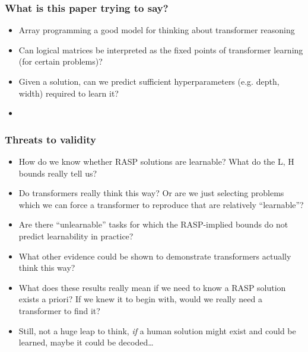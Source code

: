 \documentclass[mathserif,notheorems]{beamer}
\theoremstyle{plain} %
\theoremstyle{definition} %
\begin{document}

  \begin{frame}
    \frametitle{What is this paper trying to say?}
    \begin{itemize}
      \item Array programming a good model for thinking about transformer reasoning
      \item Can logical matrices be interpreted as the fixed points of transformer learning (for certain problems)?
      \item Given a solution, can we predict sufficient hyperparameters (e.g. depth, width) required to learn it?
      \item
    \end{itemize}
  \end{frame}

  \begin{frame}
    \frametitle{Threats to validity}
    \begin{itemize}
      \item How do we know whether RASP solutions are learnable? What do the L, H bounds really tell us?
      \item Do transformers really think this way? Or are we just selecting problems which we can force a transformer to reproduce that are relatively ``learnable''?
      \item Are there ``unlearnable'' tasks for which the RASP-implied bounds do not predict learnability in practice?
      \item What other evidence could be shown to demonstrate transformers actually think this way?
      \item What does these results really mean if we need to know a RASP solution exists a priori? If we knew it to begin with, would we really need a transformer to find it?
      \item Still, not a huge leap to think, \textit{if} a human solution might exist and could be learned, maybe it could be decoded\ldots
    \end{itemize}
  \end{frame}
\end{document}
